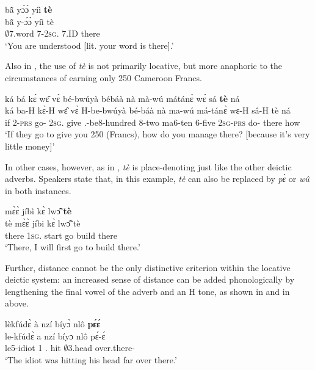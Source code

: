 \ea \label{Advte1}
  \glll     bã̂ yɔ́ɔ̀ yíì {\bfseries tè} \\
	bã̂ y-ɔ́ɔ̀ yíì tè \\
              $\emptyset$7.word 7-2\textsc{sg}.{\POSS}  7.ID there  \\
    \trans `You are understood [lit. your word is there].'
\z

\noindent Also in , the use of {\itshape tè} is not primarily locative, but more anaphoric to the circumstances of earning only 250 Cameroon Francs.

\ea \label{Advte2}
  \glll ká bá kɛ́ wɛ̂ vɛ̀ bé-bwúyà  bébáà nà mà-wú mátánɛ̀ wɛ́ sá {\bfseries tè} ná  \\
        ká ba-H kɛ̀-H wɛ̂ vɛ̀ H-be-bwúyà  bé-báà nà ma-wú má-tánɛ̀ wɛ-H sâ-H tè ná  \\
        if 2-\textsc{prs} go-{\R} 2\textsc{sg}.{\OBJ} give {\OBJ}.{\LINK}-be8-hundred 8-two {\COM} ma6-ten 6-five 2\textsc{sg}-\textsc{prs} do-{\R} there how  \\
    \trans `If they go to give you 250 (Francs), how do you manage there? [because it's very little money]'
\z

In other cases, however, as in , {\itshape tè} is place-denoting just like the other deictic adverbs. Speakers state that, in this example, {\itshape tè} can also be replaced by {\itshape pɛ̀} or {\itshape wû} in both instances.

\ea \label{Advte3}
   mɛ̀ɛ̀ jíbì kɛ̀ lwɔ̃̂ {\bfseries tè} \\
	tè mɛ̀ɛ̀ jíbi kɛ̀ lwɔ̃̂ tè \\
             there 1\textsc{sg}.{\FUT} start go build there  \\
    \trans `There, I will first go to build there.'
\z

Further, distance cannot be the only distinctive criterion within the locative deictic system: an increased sense of distance can be added phonologically by lengthening the final vowel of the adverb and an H tone, as shown in  and in  above.


\ea \label{pEE}
  \glll     lèkfúdɛ̀ à nzí bíyɔ̀ nlô {\bfseries pɛ́ɛ́}  \\
	le-kfúdɛ̀ a nzí bíyɔ nlô pɛ́-ɛ́ \\
              le5-idiot 1 {\PROG}.{\PST} hit $\emptyset$3.head over.there-{\DIST}  \\
    \trans `The idiot was hitting his head far over there.'
\z


